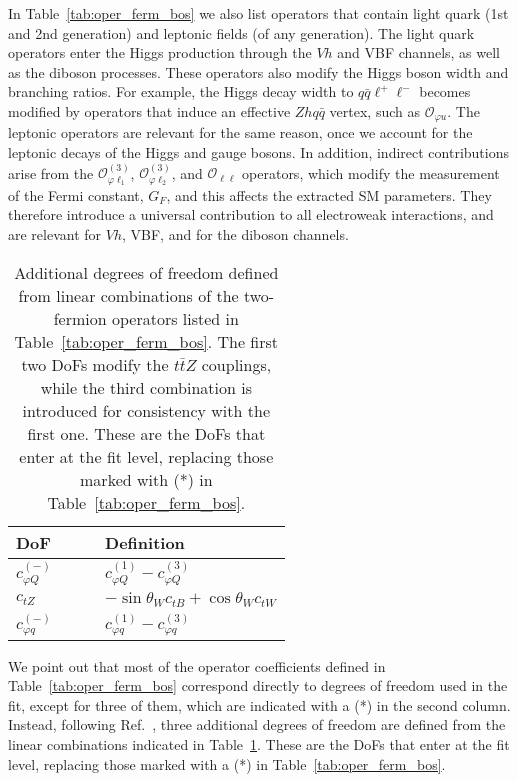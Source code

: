 In Table~\ref{tab:oper_ferm_bos} we also list operators that contain light quark
(1st and 2nd generation)
and leptonic fields (of any generation).
%
The light quark operators enter the Higgs production through the $Vh$ and
VBF channels, as well as the diboson processes.
%
These operators also modify the Higgs boson width and branching ratios.
%
For example, the Higgs decay width to $q\bar{q}\ell^+\ell^-$ becomes modified by operators that
induce an effective $Zhq\bar{q}$ vertex, such as $\mathcal{O}_{\varphi u}$.
%
The leptonic operators are relevant for the same reason,
once we account for the leptonic decays of the Higgs and gauge bosons.
%
In addition, indirect contributions arise from  the $\mathcal{O}_{\varphi
\ell_1}^{(3)}$, $\mathcal{O}_{\varphi \ell_2}^{(3)}$, and $\mathcal{O}_{\ell\ell}$ operators, which
 modify the measurement of the Fermi constant, $G_F$,
and this affects the extracted SM parameters. They therefore introduce a universal
contribution to all electroweak interactions, and are relevant for $Vh$, VBF, and for the
diboson channels.

\begin{table}[htbp]
  \begin{center}
    \renewcommand{\arraystretch}{1.49}
    \begin{tabular}{ll}
      \toprule
      DoF $\qquad$  & Definition \\
                \midrule
$c_{\varphi Q}^{(-)}$ &  $c_{\varphi Q}^{(1)} - c_{\varphi Q}^{(3)}$ \\
\midrule
$c_{tZ}$ &   $-\sin\theta_W c_{tB} + \cos\theta_W c_{tW} $\\
\midrule
$c_{\varphi q}^{(-)}$ & $ c_{\varphi q}^{(1)} - c_{\varphi q}^{(3)}$ \\
  \bottomrule
\end{tabular}
    \caption{Additional degrees of freedom defined from linear combinations of
      the two-fermion operators listed in Table~\ref{tab:oper_ferm_bos}.
The first two DoFs modify the $t\bar{t}Z$ couplings,
while the third combination is introduced for consistency with the first one.
%
These are the DoFs that enter at the fit level, replacing those
marked with  (*) in Table~\ref{tab:oper_ferm_bos}.
\label{tab:oper_ferm_bos2}}
\end{center}
\end{table}

We point out that
most of the operator coefficients defined in Table~\ref{tab:oper_ferm_bos} correspond
directly to degrees of freedom used in
the fit, except for three of them, which are
indicated with a (*) in the second column.
%
Instead, following Ref.~\cite{AguilarSaavedra:2018nen},
three additional degrees of freedom are defined from the linear
combinations indicated in Table~\ref{tab:oper_ferm_bos2}.
%
These are the DoFs that enter at the fit level, replacing those
marked with  a (*) in Table~\ref{tab:oper_ferm_bos}.

